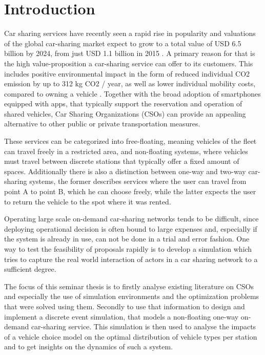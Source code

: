 \clearpage
\section{Introduction}
\label{sec:Intro}

Car sharing services have recently seen a rapid rise in popularity 
and valuations of the global car-sharing market expect to grow to
a total value of USD 6.5 billion by 2024, from just USD 1.1 billion in 2015 . 
A primary reason for that is the high value-proposition a car-sharing service
can offer to its customers. This includes positive environmental impact in the form of
reduced individual CO2 emission by up to 312 kg CO2 / year, as well as
lower individual mobility costs, compared to owning a vehicle . Together with the
broad adoption of smartphones equipped with apps, that typically
support the reservation and operation of shared vehicles, Car Sharing Organizations (CSOs)
can provide an appealing alternative to other public or private transportation measures.

These services can be categorized into free-floating, meaning vehicles of the fleet
can travel freely in a restricted area, and non-floating systems, where vehicles must travel
between discrete stations that typically offer a fixed amount of spaces. Additionally
there is also a distinction between one-way and two-way car-sharing systems, the former
describes services where the user can travel from point A to point B, which he can choose
freely, while the latter expects the user to return the vehicle to the spot where it was
rented.

Operating large scale on-demand car-sharing networks tends to be difficult, since
deploying operational decision is often bound to large expenses and, especially if the
system is already in use, can not be done in a trial and error fashion. One way to test the feasibility of
proposals rapidly is to develop a simulation which tries to capture the real world
interaction of actors in a car sharing network to a sufficient degree.

The focus of this seminar thesis is to firstly analyse existing literature on CSOs and especially
the use of simulation environments and the optimization problems that were solved using them.
Secondly to use that information to design
and implement a discrete event simulation, that models a non-floating one-way on-demand
car-sharing service. This simulation is then used to analyse the impacts of a vehicle
choice model on the optimal distribution of vehicle types per station and to get
insights on the dynamics of such a system. 
